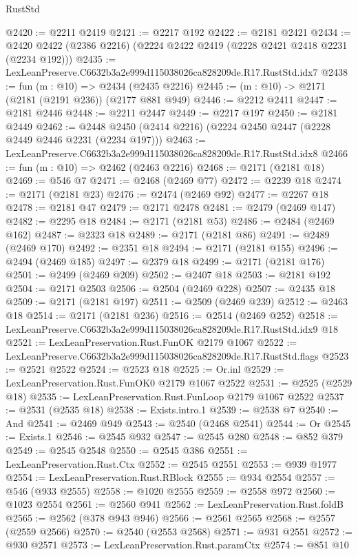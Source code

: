 \begin{lexlean}{RustStd}
\begin{coremodule}
@2420 := @2211 @2419
@2421 := @2217 @192
@2422 := @2181 @2421
@2434 := @2420 @2422 (@2386 @2216) (@2224 @2422 @2419 (@2228 @2421 @2418 @2231 (@2234 @192)))
@2435 := LexLeanPreserve.C6632b3a2e999d115038026ca828209de.R17.RustStd.idx7
@2438 := fun (m : @10) => @2434 (@2435 @2216)
@2445 := (m : @10) -> @2171 (@2181 (@2191 @236)) (@2177 @881 @949)
@2446 := @2212 @2411
@2447 := @2181 @2446
@2448 := @2211 @2447
@2449 := @2217 @197
@2450 := @2181 @2449
@2462 := @2448 @2450 (@2414 @2216) (@2224 @2450 @2447 (@2228 @2449 @2446 @2231 (@2234 @197)))
@2463 := LexLeanPreserve.C6632b3a2e999d115038026ca828209de.R17.RustStd.idx8
@2466 := fun (m : @10) => @2462 (@2463 @2216)
@2468 := @2171 (@2181 @18)
@2469 := @546 @7
@2471 := @2468 (@2469 @77)
@2472 := @2239 @18
@2474 := @2171 (@2181 @23)
@2476 := @2474 (@2469 @92)
@2477 := @2267 @18
@2478 := @2181 @47
@2479 := @2171 @2478
@2481 := @2479 (@2469 @147)
@2482 := @2295 @18
@2484 := @2171 (@2181 @53)
@2486 := @2484 (@2469 @162)
@2487 := @2323 @18
@2489 := @2171 (@2181 @86)
@2491 := @2489 (@2469 @170)
@2492 := @2351 @18
@2494 := @2171 (@2181 @155)
@2496 := @2494 (@2469 @185)
@2497 := @2379 @18
@2499 := @2171 (@2181 @176)
@2501 := @2499 (@2469 @209)
@2502 := @2407 @18
@2503 := @2181 @192
@2504 := @2171 @2503
@2506 := @2504 (@2469 @228)
@2507 := @2435 @18
@2509 := @2171 (@2181 @197)
@2511 := @2509 (@2469 @239)
@2512 := @2463 @18
@2514 := @2171 (@2181 @236)
@2516 := @2514 (@2469 @252)
@2518 := LexLeanPreserve.C6632b3a2e999d115038026ca828209de.R17.RustStd.idx9 @18
@2521 := LexLeanPreservation.Rust.FunOK @2179 @1067
@2522 := LexLeanPreserve.C6632b3a2e999d115038026ca828209de.R17.RustStd.flags
@2523 := @2521 @2522
@2524 := @2523 @18
@2525 := Or.inl
@2529 := LexLeanPreservation.Rust.FunOK0 @2179 @1067 @2522
@2531 := @2525 (@2529 @18)
@2535 := LexLeanPreservation.Rust.FunLoop @2179 @1067 @2522
@2537 := @2531 (@2535 @18)
@2538 := Exists.intro.{1}
@2539 := @2538 @7
@2540 := And
@2541 := @2469 @949
@2543 := @2540 (@2468 @2541)
@2544 := Or
@2545 := Exists.{1}
@2546 := @2545 @932
@2547 := @2545 @280
@2548 := @852 @379
@2549 := @2545 @2548
@2550 := @2545 @386
@2551 := LexLeanPreservation.Rust.Ctx
@2552 := @2545 @2551
@2553 := @939 @1977
@2554 := LexLeanPreservation.Rust.RBlock
@2555 := @934 @2554
@2557 := @546 (@933 @2555)
@2558 := @1020 @2555
@2559 := @2558 @972
@2560 := @1023 @2554
@2561 := @2560 @941
@2562 := LexLeanPreservation.Rust.foldB
@2565 := @2562 (@378 @943 @946)
@2566 := @2561 @2565
@2568 := @2557 (@2559 @2566)
@2570 := @2540 (@2553 @2568)
@2571 := @931 @2551
@2572 := @930 @2571
@2573 := LexLeanPreservation.Rust.paramCtx
@2574 := @851 @10

\end{coremodule}
\end{lexlean}
